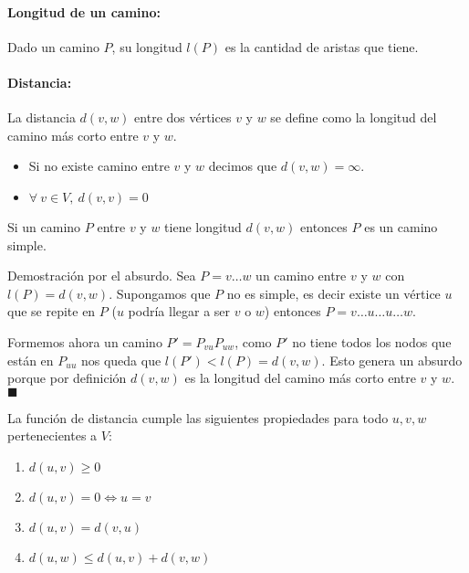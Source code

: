 \paragraph{Longitud de un camino:} Dado un camino \(P\), su longitud \(l(P)\) es la cantidad de aristas que tiene.

\paragraph{Distancia:} La distancia \(d(v,w)\) entre dos vértices \(v\) y \(w\) se define como la longitud del camino más corto entre \(v\) y \(w\). 
\begin{itemize}
	\item Si no existe camino entre \(v\) y \(w\) decimos que \(d(v,w) = \infty\).
	\item \(\forall~v\in V,~d(v,v) = 0\)
\end{itemize}

\begin{proposicion}
	Si un camino \(P\) entre \(v\) y \(w\) tiene longitud \(d(v,w)\) entonces \(P\) es un camino simple.
\end{proposicion}
\begin{demo}
	Demostración por el absurdo. Sea \(P = v\dots w\) un camino entre \(v\) y \(w\) con \(l(P) = d(v,w)\). Supongamos que \(P\) no es simple, es decir existe un vértice \(u\) que se repite en \(P\) (\(u\) podría llegar a ser \(v\) o \(w\)) entonces \(P = v\dots u \dots u \dots w\).
	
	Formemos ahora un camino \(P' = P_{vu}P_{uw}\), como \(P'\) no tiene todos los nodos que están en \(P_{uu}\) nos queda que \(l(P') < l(P) = d(v,w)\). Esto genera un absurdo porque por definición \(d(v,w)\) es la longitud del camino más corto entre \(v\) y \(w\). \(\blacksquare\)
\end{demo}

\begin{proposicion}
	La función de distancia cumple las siguientes propiedades para todo \(u,v,w\) pertenecientes a \(V\):
	\begin{enumerate}
		\item \(d(u,v)\geq 0\)
		\item \(d(u,v)=0 \iff u=v\)
		\item \(d(u,v) = d(v,u)\)
		\item \(d(u,w) \leq d(u,v) + d(v,w)\)
	\end{enumerate}
\end{proposicion}

